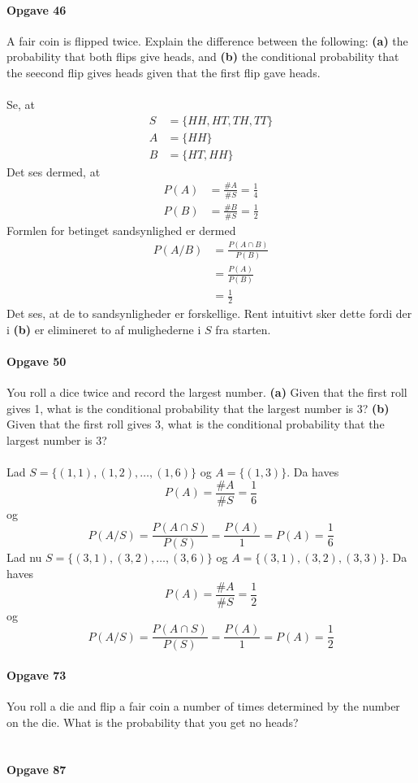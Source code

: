 \documentclass[12pt,a4paper,draft]{report}
\begin{document}
\paragraph{Opgave 46}
A fair coin is flipped twice. Explain the difference between  the following: \textbf{(a)} the probability  that both flips  give heads, and \textbf{(b)} the conditional probability that the seecond flip gives heads given that the first flip gave heads.\\\\
Se, at 
\begin{align}
S&=\{HH,HT,TH,TT\}\\
A&=\{HH\}\\
B&=\{HT,HH\}
\end{align}
Det ses dermed, at
\begin{align}
P(A)&=\frac{\# A}{\# S}=\frac{1}{4}\\
P(B)&=\frac{\# B}{\# S}=\frac{1}{2}
\end{align}
Formlen for betinget sandsynlighed er dermed
\begin{align}
P(A/B)&=\frac{P(A\cap B)}{P(B)}\\
&=\frac{P(A)}{P(B)}\\
&=\frac{1}{2}
\end{align}
Det ses, at de to sandsynligheder er forskellige. Rent intuitivt sker dette fordi der i \textbf{(b)} er elimineret to af mulighederne i $S$ fra starten.
\paragraph{Opgave 50}
You roll a dice twice  and record the largest number. \textbf{(a)} Given that the first roll gives 1, what is the conditional probability that the largest number is 3? \textbf{(b)} Given that the first roll gives 3, what is the conditional probability that the largest number is 3?\\\\
Lad $S=\{(1,1),(1,2),\hdots,(1,6)\}$ og $A=\{(1,3)\}$.
Da haves
\begin{equation}
P(A)=\frac{\# A}{\# S}=\frac{1}{6}
\end{equation}
og
\begin{equation}
P(A/S)=\frac{P(A\cap S)}{P(S)}=\frac{P(A)}{1}=P(A)=\frac{1}{6}
\end{equation}
Lad nu $S=\{(3,1),(3,2),\hdots,(3,6)\}$ og $A=\{(3,1),(3,2),(3,3)\}$. Da haves
\begin{equation}
P(A)=\frac{\# A}{\# S}=\frac{1}{2}
\end{equation}
og
\begin{equation}
P(A/S)=\frac{P(A\cap S)}{P(S)}=\frac{P(A)}{1}=P(A)=\frac{1}{2}
\end{equation}
\paragraph{Opgave 73}
You roll a die and flip a fair coin a number of times  determined by the number on the die. What is the probability that you get no heads?\\\\

\paragraph{Opgave 87}
\end{document}
